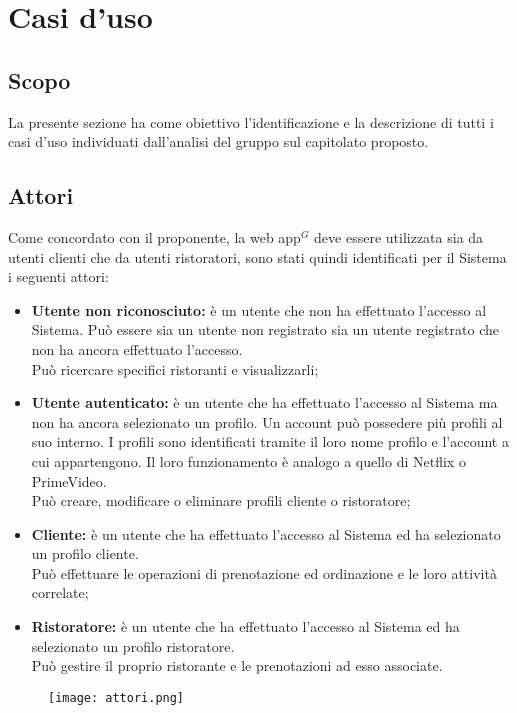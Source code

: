 \section{Casi d'uso}
\subsection{Scopo}

La presente sezione ha come obiettivo l'identificazione e la descrizione di tutti i casi d'uso individuati dall'analisi del gruppo sul capitolato proposto.
    
\subsection{Attori}
Come concordato con il proponente, la web app$^{G}$ deve essere utilizzata sia da utenti clienti che da utenti ristoratori, sono stati quindi identificati per il Sistema i seguenti attori:
\begin{itemize}
    \item \textbf{Utente non riconosciuto:} è un utente che non ha effettuato l'accesso al Sistema. Può essere sia un utente non registrato sia un utente registrato che non ha ancora effettuato l'accesso.\\
    Può ricercare specifici ristoranti e visualizzarli;
    \item \textbf{Utente autenticato:} è un utente che ha effettuato l'accesso al Sistema ma non ha ancora selezionato un profilo. Un account può possedere più profili al suo interno. I profili sono identificati tramite il loro nome profilo e l'account a cui appartengono. Il loro funzionamento è analogo a quello di Netflix o PrimeVideo. \\
    Può creare, modificare o eliminare profili cliente o ristoratore;
    \item \textbf{Cliente:} è un utente che ha effettuato l'accesso al Sistema ed ha selezionato un profilo cliente.\\
    Può effettuare le operazioni di prenotazione ed ordinazione e le loro attività correlate;
    \item \textbf{Ristoratore:} è un utente che ha effettuato l'accesso al Sistema ed ha selezionato un profilo ristoratore.\\
    Può gestire il proprio ristorante e le prenotazioni ad esso associate.
\end{itemize}
\begin{figure}[h] \texttt{[image: attori.png]} \end{figure}

